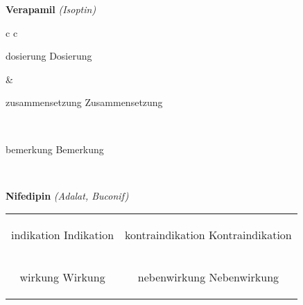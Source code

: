 \documentclass[12pt]{beamer}
\begin{document}
\begin{frame}{
    \textbf{Verapamil}
    \textit{(Isoptin)}
}
    \begin{tabular}{c c}
        \begin{beamercolorbox}[wd=\boxwidth\textwidth,ht=\boxheight\textheight,sep=1em]{dosierung}
        Dosierung
        \end{beamercolorbox} & 
        \begin{beamercolorbox}[wd=\boxwidth\textwidth,ht=\boxheight\textheight,sep=1em]{zusammensetzung}
        Zusammensetzung
        \end{beamercolorbox} \\
        \begin{beamercolorbox}[wd=\textwidth,ht=\boxheight\textheight,sep=1em]{bemerkung}
        Bemerkung
        \end{beamercolorbox} \\
    \end{tabular}
\end{frame}

\begin{frame}{
    \textbf{Nifedipin}
    \textit{(Adalat, Buconif)}
}
    \begin{tabular}{c c}
        \begin{beamercolorbox}[wd=\boxwidth\textwidth,ht=\boxheight\textheight,sep=1em]{indikation}
        Indikation
        \end{beamercolorbox} & 
        \begin{beamercolorbox}[wd=\boxwidth\textwidth,ht=\boxheight\textheight,sep=1em]{kontraindikation}
        Kontraindikation 
        \end{beamercolorbox} \\
        \begin{beamercolorbox}[wd=\boxwidth\textwidth,ht=\boxheight\textheight,sep=1em]{wirkung}
        Wirkung
        \end{beamercolorbox} & 
        \begin{beamercolorbox}[wd=\boxwidth\textwidth,ht=\boxheight\textheight,sep=1em]{nebenwirkung}
        Nebenwirkung
        \end{beamercolorbox} \\
    \end{tabular}
\end{frame}
\end{document}
